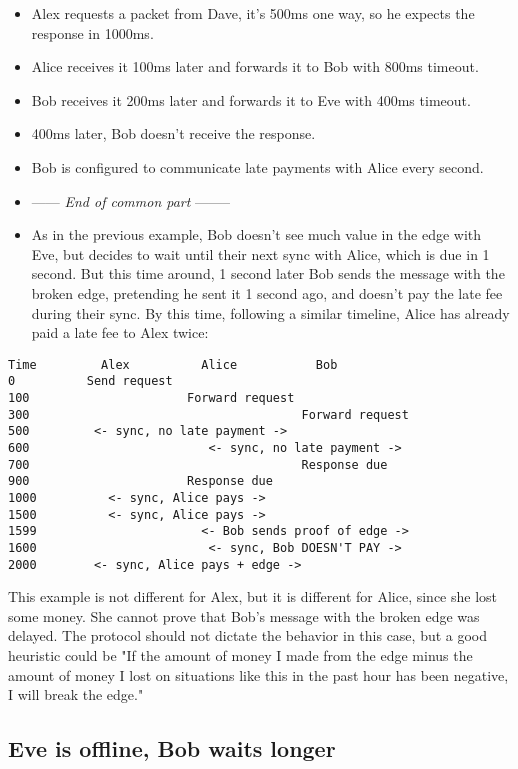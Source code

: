 \documentclass{article}
\newcommand{\textapprox}{\raisebox{0.5ex}{\texttildelow}}
\begin{document}
\begin{itemize}
    \item Alex requests a packet from Dave, it's 500ms one way, so he expects the response in 1000ms.
    \item Alice receives it 100ms later and forwards it to Bob with 800ms timeout.
    \item Bob receives it 200ms later and forwards it to Eve with 400ms timeout.
    \item 400ms later, Bob doesn't receive the response.
    \item Bob is configured to communicate late payments with Alice every second.
    \item ------ \textit{End of common part} --------
    \item As in the previous example, Bob doesn't see much value in the edge with Eve, but decides to wait until their next sync with Alice, which is due in \textapprox 1 second. But this time around, \textapprox 1 second later Bob sends the message with the broken edge, pretending he sent it 1 second ago, and doesn't pay the late fee during their sync. By this time, following a similar timeline, Alice has already paid a late fee to Alex twice:
\end{itemize}

\begin{verbatim}
Time         Alex          Alice           Bob
0          Send request
100                      Forward request
300                                      Forward request
500         <- sync, no late payment ->
600                         <- sync, no late payment ->
700                                      Response due
900                      Response due
1000          <- sync, Alice pays ->
1500          <- sync, Alice pays ->
1599                       <- Bob sends proof of edge ->
1600                        <- sync, Bob DOESN'T PAY ->
2000        <- sync, Alice pays + edge ->
\end{verbatim}

This example is not different for Alex, but it is different for Alice, since she lost some money. She cannot prove that Bob's message with the broken edge was delayed. The protocol should not dictate the behavior in this case, but a good heuristic could be "If the amount of money I made from the edge minus the amount of money I lost on situations like this in the past hour has been negative, I will break the edge."

\subsection{Eve is offline, Bob waits longer}
\end{document}

